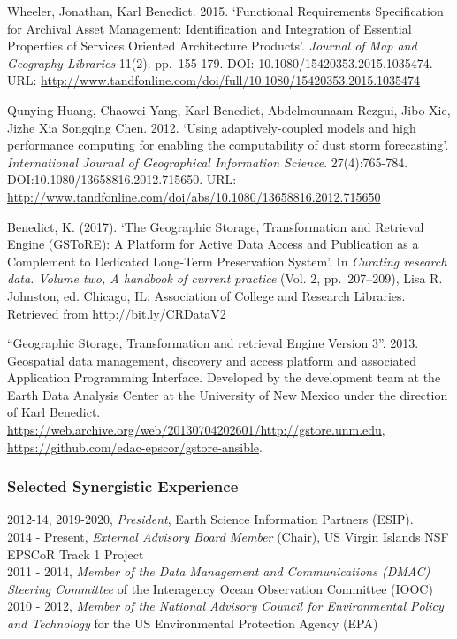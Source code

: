 \documentclass[]{article}
\begin{document}
Wheeler, Jonathan, Karl Benedict. 2015. `Functional Requirements
Specification for Archival Asset Management: Identification and
Integration of Essential Properties of Services Oriented Architecture
Products'. \emph{Journal of Map and Geography Libraries} 11(2).
pp.~155-179. DOI: 10.1080/15420353.2015.1035474. URL:
\url{http://www.tandfonline.com/doi/full/10.1080/15420353.2015.1035474}

Qunying Huang, Chaowei Yang, Karl Benedict, Abdelmounaam Rezgui, Jibo
Xie, Jizhe Xia Songqing Chen. 2012. `Using adaptively-coupled models and
high performance computing for enabling the computability of dust storm
forecasting'. \emph{International Journal of Geographical Information
Science}. 27(4):765-784. DOI:10.1080/13658816.2012.715650. URL:
\url{http://www.tandfonline.com/doi/abs/10.1080/13658816.2012.715650}

Benedict, K. (2017). `The Geographic Storage, Transformation and
Retrieval Engine (GSToRE): A Platform for Active Data Access and
Publication as a Complement to Dedicated Long-Term Preservation System'.
In \emph{Curating research data. Volume two, A handbook of current
practice} (Vol. 2, pp.~207--209), Lisa R. Johnston, ed. Chicago, IL:
Association of College and Research Libraries. Retrieved from
\url{http://bit.ly/CRDataV2}

``Geographic Storage, Transformation and retrieval Engine Version 3''.
2013. Geospatial data management, discovery and access platform and
associated Application Programming Interface. Developed by the
development team at the Earth Data Analysis Center at the University of
New Mexico under the direction of Karl Benedict.
\url{https://web.archive.org/web/20130704202601/http://gstore.unm.edu},
\url{https://github.com/edac-epscor/gstore-ansible}.

\hypertarget{selected-synergistic-experience}{%
\subsubsection{Selected Synergistic
Experience}\label{selected-synergistic-experience}}

2012-14, 2019-2020, \emph{President}, Earth Science Information Partners
(ESIP).\\
2014 - Present, \emph{External Advisory Board Member} (Chair), US Virgin
Islands NSF EPSCoR Track 1 Project\\
2011 - 2014, \emph{Member of the Data Management and Communications
(DMAC) Steering Committee} of the Interagency Ocean Observation
Committee (IOOC)\\
2010 - 2012, \emph{Member of the National Advisory Council for
Environmental Policy and Technology} for the US Environmental Protection
Agency (EPA)
\end{document}
